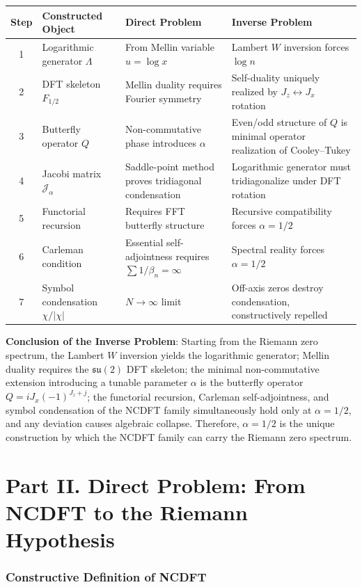 \documentclass[12pt,a4paper]{amsart}
\theoremstyle{plain}
\theoremstyle{definition}
\theoremstyle{remark}
\begin{document}
\begin{center}
\begin{tabular}{|c|l|l|l|}
\hline
Step & Constructed Object & Direct Problem & Inverse Problem \\
\hline
1 & Logarithmic generator $\Lambda$ & From Mellin variable $u=\log x$ & Lambert $W$ inversion forces $\log n$ \\
2 & DFT skeleton $F_{1/2}$ & Mellin duality requires Fourier symmetry & Self-duality uniquely realized by $J_z\leftrightarrow J_x$ rotation \\
3 & Butterfly operator $Q$ & Non-commutative phase introduces $\alpha$ & Even/odd structure of $Q$ is minimal operator realization of Cooley--Tukey \\
4 & Jacobi matrix $\mathcal{J}_\alpha$ & Saddle-point method proves tridiagonal condensation & Logarithmic generator must tridiagonalize under DFT rotation \\
5 & Functorial recursion & Requires FFT butterfly structure & Recursive compatibility forces $\alpha=1/2$ \\
6 & Carleman condition & Essential self-adjointness requires $\sum 1/\beta_n=\infty$ & Spectral reality forces $\alpha=1/2$ \\
7 & Symbol condensation $\chi/|\chi|$ & $N\to\infty$ limit & Off-axis zeros destroy condensation, constructively repelled \\
\hline
\end{tabular}
\end{center}

\textbf{Conclusion of the Inverse Problem}: Starting from the Riemann zero spectrum, the Lambert $W$ inversion yields the logarithmic generator; Mellin duality requires the $\mathfrak{su}(2)$ DFT skeleton; the minimal non-commutative extension introducing a tunable parameter $\alpha$ is the butterfly operator $Q=iJ_x(-1)^{J_z+j}$; the functorial recursion, Carleman self-adjointness, and symbol condensation of the NCDFT family simultaneously hold only at $\alpha=1/2$, and any deviation causes algebraic collapse. Therefore, $\alpha=1/2$ is the unique construction by which the NCDFT family can carry the Riemann zero spectrum.

\part*{Part II. Direct Problem: From NCDFT to the Riemann Hypothesis}

\section{Constructive Definition of NCDFT}
\end{document}
